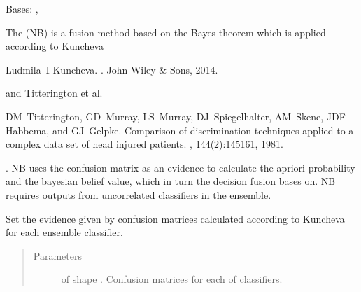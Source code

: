\documentclass[letterpaper,10pt,english]{sphinxmanual}
\begin{document}
\begin{fulllineitems}
\label{\detokenize{pusion.core.naive_bayes_combiner:pusion.core.naive_bayes_combiner.NaiveBayesCombiner}}
\sphinxAtStartPar
Bases: {\hyperref[\detokenize{pusion.core.combiner:pusion.core.combiner.EvidenceBasedCombiner}]{}}, {\hyperref[\detokenize{pusion.core.combiner:pusion.core.combiner.TrainableCombiner}]{}}

\sphinxAtStartPar
The {\hyperref[\detokenize{pusion.core.naive_bayes_combiner:pusion.core.naive_bayes_combiner.NaiveBayesCombiner}]{}} (NB) is a fusion method based on the Bayes theorem which is applied according to
Kuncheva %
\begin{footnote}[1]\sphinxAtStartFootnote
Ludmila I Kuncheva. . John Wiley \& Sons, 2014.
%
\end{footnote} and Titterington et al. %
\begin{footnote}[2]\sphinxAtStartFootnote
DM Titterington, GD Murray, LS Murray, DJ Spiegelhalter, AM Skene, JDF Habbema, and GJ Gelpke. Comparison of discrimination techniques applied to a complex data set of head injured patients. , 144(2):145\textendash{}161, 1981.
%
\end{footnote}.
NB uses the confusion matrix as an evidence to calculate the a\sphinxhyphen{}priori probability and the bayesian belief value,
which in turn the decision fusion bases on. NB requires outputs from uncorrelated classifiers in the ensemble.

\sphinxAtStartPar


\begin{fulllineitems}
\label{\detokenize{pusion.core.naive_bayes_combiner:pusion.core.naive_bayes_combiner.NaiveBayesCombiner.set_evidence}}
\sphinxAtStartPar
Set the evidence given by confusion matrices calculated according to Kuncheva \sphinxfootnotemark[1]
for each ensemble classifier.
\begin{quote}\begin{description}
\item[{Parameters}] \leavevmode
\sphinxAtStartPar
{} \textendash{}  of shape .
Confusion matrices for each of  classifiers.


\end{description}
\end{quote}
\end{fulllineitems}
\end{fulllineitems}
\end{document}
